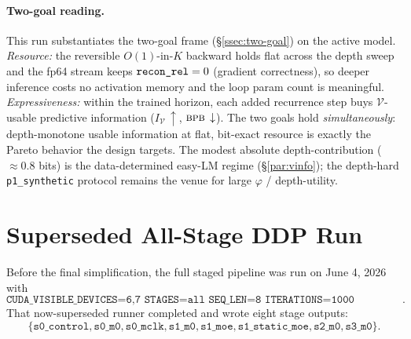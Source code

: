 \documentclass[11pt]{article}
\newcommand{\bpb}{\textsc{bpb}}
\newcommand{\code}[1]{\texttt{#1}}
\begin{document}
\paragraph{Two-goal reading.}
This run substantiates the two-goal frame (\S\ref{ssec:two-goal}) on the active model.  \emph{Resource:}
the reversible \(O(1)\)-in-\(K\) backward holds \code{} flat across the depth sweep
and the fp64 stream keeps \(\code{\detokenize{recon_rel}}=0\) (gradient correctness), so deeper inference
costs no activation memory and the loop param count is meaningful.  \emph{Expressiveness:} within the
trained horizon, each added recurrence step buys \(\mathcal V\)-usable predictive information
(\(I_{\mathcal V}\,\uparrow\), \(\bpb\,\downarrow\)).  The two goals hold \emph{simultaneously}:
depth-monotone usable information at flat, bit-exact resource is exactly the Pareto behavior the design
targets.  The modest absolute depth-contribution (\code{}\(\approx0.8\) bits)
is the data-determined easy-LM regime (\S\ref{par:vinfo}); the depth-hard \code{p1\_synthetic} protocol
remains the venue for large \(\varphi\) / depth-utility.

\section{Superseded All-Stage DDP Run}
\label{sec:allstage-run}

Before the final simplification, the full staged pipeline was run on June 4, 2026 with
\[
\code{CUDA\_VISIBLE\_DEVICES=6,7\ STAGES=all\ SEQ\_LEN=8\ ITERATIONS=1000\ RUN\_TAG=gpu67\_allstages\_seq8\_i1000\_fix}.
\]
That now-superseded runner completed and wrote eight stage outputs:
\[
\{\code{s0\_control},\code{s0\_m0},\code{s0\_mclk},
\code{s1\_m0},\code{s1\_moe},\code{s1\_static\_moe},
\code{s2\_m0},\code{s3\_m0}\}.
\]
\end{document}
